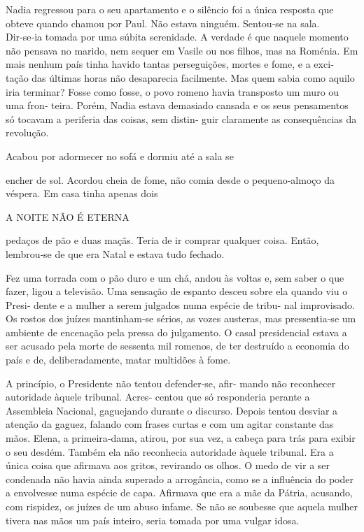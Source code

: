 Nadia regressou para o seu apartamento e o silêncio foi a única resposta
que obteve quando chamou por Paul. Não estava ninguém. Sentou‑se na
sala. Dir‑se‑ia tomada por uma súbita serenidade. A verdade é que
naquele momento não pensava no marido, nem sequer em Vasile ou nos
filhos, mas na Roménia. Em mais nenhum país tinha havido tantas
perseguições, mortes e fome, e a exci‑ tação das últimas horas não
desaparecia facilmente. Mas quem sabia como aquilo iria terminar? Fosse
como fosse, o povo romeno havia transposto um muro ou uma fron‑ teira.
Porém, Nadia estava demasiado cansada e os seus pensamentos só tocavam a
periferia das coisas, sem distin‑ guir claramente as consequências da
revolução.

Acabou por adormecer no sofá e dormiu até a sala se

encher de sol. Acordou cheia de fome, não comia desde o pequeno‑almoço
da véspera. Em casa tinha apenas dois

A NOITE NÃO É ETERNA

pedaços de pão e duas maçãs. Teria de ir comprar qualquer coisa. Então,
lembrou‑se de que era Natal e estava tudo fechado.

Fez uma torrada com o pão duro e um chá, andou às voltas e, sem saber o
que fazer, ligou a televisão. Uma sensação de espanto desceu sobre ela
quando viu o Presi‑ dente e a mulher a serem julgados numa espécie de
tribu‑ nal improvisado. Os rostos dos juízes mantinham‑se sérios, as
vozes austeras, mas pressentia‑se um ambiente de encenação pela pressa
do julgamento. O casal presidencial estava a ser acusado pela morte de
sessenta mil romenos, de ter destruído a economia do país e de,
deliberadamente, matar multidões à fome.

A princípio, o Presidente não tentou defender‑se, afir‑ mando não
reconhecer autoridade àquele tribunal. Acres‑ centou que só responderia
perante a Assembleia Nacional, gaguejando durante o discurso. Depois
tentou desviar a atenção da gaguez, falando com frases curtas e com um
agitar constante das mãos. Elena, a primeira‑dama, atirou, por sua vez,
a cabeça para trás para exibir o seu desdém. Também ela não reconhecia
autoridade àquele tribunal. Era a única coisa que afirmava aos gritos,
revirando os olhos. O medo de vir a ser condenada não havia ainda
superado a arrogância, como se a influência do poder a envolvesse numa
espécie de capa. Afirmava que era a mãe da Pátria, acusando, com
rispidez, os juízes de um abuso infame. Se não se soubesse que aquela
mulher tivera nas mãos um país inteiro, seria tomada por uma vulgar
idosa.

